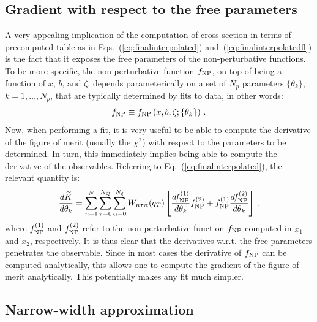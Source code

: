 \documentclass[10pt,a4paper]{article}
\begin{document}
\subsection{Gradient with respect to the free parameters}

A very appealing implication of the computation of cross section in
terms of precomputed table as in Eqs.~(\ref{eq:finalinterpolated})
and~(\ref{eq:finalinterpolatedfl}) is the fact that it exposes the
free parameters of the non-perturbative functions. To be more
specific, the non-perturbative function $f_{\rm NP}$, on top of being
a function of $x$, $b$, and $\zeta$, depends parameterically on a set
of $N_p$ parameters $\{\theta_k\}$, $k=1,\dots,N_p$, that are
typically determined by fits to data, in other words:
\begin{equation}
f_{\rm NP}\equiv f_{\rm NP}\left(x,b,\zeta;\{\theta_k\}\right)\,.
\end{equation}
Now, when performing a fit, it is very useful to be able to compute
the derivative of the figure of merit (usually the $\chi^2$) with
respect to the parameters to be determined. In turn, this immediately
implies being able to compute the derivative of the
observables. Referring to Eq.~(\ref{eq:finalinterpolated}), the
relevant quantity is:
\begin{equation}
\frac{d\widetilde{K}}{d\theta_k}=
\sum_{n=1}^N
  \sum_{\tau=0}^{N_Q}\sum_{\alpha=0}^{N_\xi} W_{n\tau\alpha}(q_T) \left[\frac{d f_{\rm NP}^{(1)}}{d\theta_k} f_{\rm NP}^{(2)}+f_{\rm NP}^{(1)}\frac{d f_{\rm NP}^{(2)}}{d\theta_k} \right]\,,
\end{equation}
where $f_{\rm NP}^{(1)}$ and $f_{\rm NP}^{(2)}$ refer to the
non-perturbative function $f_{\rm NP}$ computed in $x_1$ and $x_2$,
respectively. It is thus clear that the derivatives w.r.t. the free
parameters penetrates the observable. Since in most cases the
derivative of $f_{\rm NP}$ can be computed analytically, this allows
one to compute the gradient of the figure of merit analytically. This
potentially makes any fit much simpler.

\subsection{Narrow-width approximation}
\end{document}
